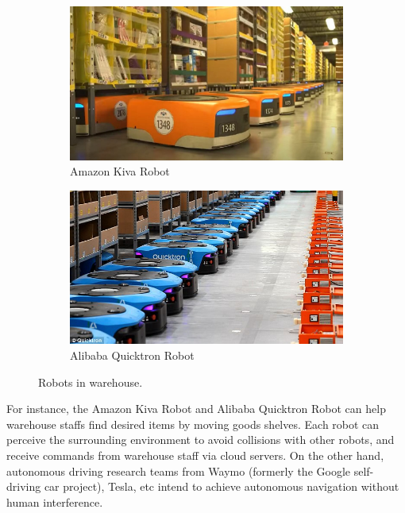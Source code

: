 \begin{figure}[H]
\centering
\begin{subfigure}[b]{0.485\textwidth}
    \centering
    \includegraphics[width=\textwidth]{figures/chapter_intro/amazon_kiva.jpg}
    \caption{Amazon Kiva Robot}
    \label{fig:kiva}
\end{subfigure}
\hfill
\begin{subfigure}[b]{0.485\textwidth}
    \centering
    \includegraphics[width=\textwidth]{figures/chapter_intro/alibaba_quicktron.jpg}
    \caption{Alibaba Quicktron Robot}
    \label{fig:quicktron}
\end{subfigure}
\hfill
\caption{Robots in warehouse.}
\label{fig.robot}
\end{figure}

For instance, the Amazon Kiva Robot and Alibaba Quicktron Robot can help warehouse staffs find desired items by moving goods shelves. Each robot can perceive the surrounding environment to avoid collisions with other robots, and receive commands from warehouse staff via cloud servers. On the other hand, autonomous driving research teams from Waymo (formerly the Google self-driving car project), Tesla, etc intend to achieve autonomous navigation without human interference.

